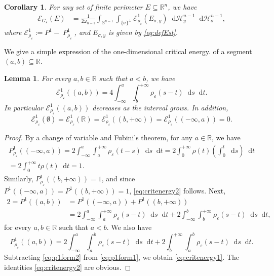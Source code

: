 \documentclass[JEP,XML,SOM,Unicode,published]{cedram}
\numberwithin{equation}{section}
\theoremstyle{plain}
\newtheorem{lem}[thm]{Lemma}
\newtheorem{cor}[thm]{Corollary}
\theoremstyle{definition}
\newcommand{\numberset}[1]{{\mathbb{#1}}}
\newcommand{\R}{\numberset{R}}
\newcommand{\dt}{\mathop{}\mathopen{}\mathrm{d}t}
\newcommand{\ds}{\mathop{}\mathopen{}\mathrm{d}s}
\newcommand{\dH}{\mathop{}\mathopen{}\mathrm{d}\mathscr{H}}
\newcommand{\bbS}{\mathbb{S}}
\newcommand{\calE}{{\mathcal{E}}}
\let\om\omega
\let\eps\varepsilon
\newcommand{\Ren}{{\R^n}}
\newcommand{\subsq}{\subseteq}
\DeclareMathOperator{\Per}{\mathit{P}}
\begin{document}
\begin{cor}\label{cor:expecrit}
For any set of finite perimeter $E\subsq\Ren$, we have
\[
\begin{aligned}
\calE_{G_\eps}(E)
&=\frac{1}{2\om_{n-1}} \int_{\bbS^{n-1}} \int_{\{\sigma\}^\perp}
\calE^1_{\rho_\eps}(E_{\sigma,y}) \dH_y^{n-1}\dH^{n-1}_\sigma,
\end{aligned}
\]
where $\calE^1_{\rho_\eps}:=P^1-\Per^1_{\rho_\eps}$, and $E_{\sigma,y}$ is given by
\cref{eq:defEst}.
\end{cor}

We give a simple expression of the one-dimensional critical energy. of a segment $(a,b)\subsq\R$.

\begin{lem}\label{lem:critenergy1}
For every $a,b\in \R$ such that $a<b$, we have
\begin{equation}\label{eq:critenergy1}
\calE^1_{\rho_\eps}((a,b))=4\int_{-\infty}^a\int_b^{+\infty} \rho_\eps(s-t)\ds\dt.
\end{equation}
In particular $\calE^1_{\rho_\eps}((a,b))$ decreases as the interval grows.
In addition,
\begin{equation}\label{eq:critenergy2}
\calE^1_{\rho_\eps}(\emptyset)=\calE^1_{\rho_\eps}(\R)=\calE^1_{\rho_\eps}((b,+\infty))
=\calE^1_{\rho_\eps}((-\infty,a))=0.
\end{equation}
\end{lem}

\begin{proof}
By a change of variable and Fubini's theorem, for any $a\in\R$, we have
\begin{multline*}
P_{\rho_\eps}^1((-\infty,a))=2\int_{-\infty}^a\int_a^{+\infty} \rho_\eps(t-s)\ds\dt
=2\int_0^{+\infty} \rho(t) \left(\int_0^t \ds\right)\dt\\
=2\int_0^{+\infty} t\rho(t)\dt=1.
\end{multline*}
Similarly, $P_{\rho_\eps}^1((b,+\infty))=1$, and since $P^1((-\infty,a))=P^1((b,+\infty))=1$,
\cref{eq:critenergy2} follows.
Next,
\begin{equation}\label{eq:p1form1}
\begin{aligned}
2=P^1((a,b))
&=P^1((-\infty,a))+P^1((b,+\infty))\\
&=2\int_{-\infty}^a\int_a^{+\infty} \rho_\eps(s-t)\ds\dt+2\int_{-\infty}^b\int_b^{+\infty}
\rho_\eps(s-t)\ds\dt,
\end{aligned}
\end{equation}
for every $a,b\in\R$ such that $a<b$. We also have
\begin{equation}\label{eq:p1form2}
P^1_{\rho_\eps}((a,b))=2\int_{-\infty}^a \int_a^b \rho_\eps(s-t)\ds\dt+2\int_b^{+\infty} \int_a^b
\rho_\eps(s-t)\ds\dt.
\end{equation}
Subtracting \cref{eq:p1form2} from \cref{eq:p1form1}, we obtain \cref{eq:critenergy1}. The
identities \cref{eq:critenergy2} are obvious.
\end{proof}
\end{document}
